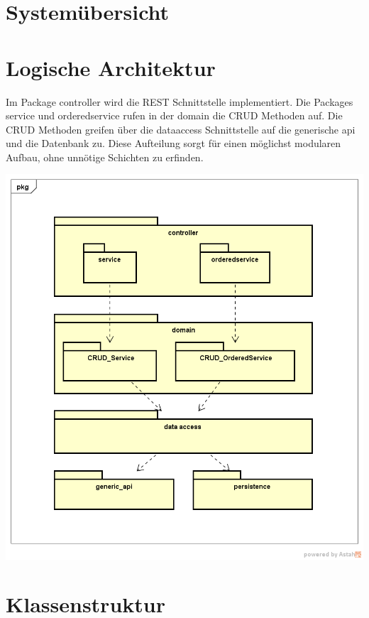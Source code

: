 \documentclass[11pt]{scrartcl}
\begin{document}
\newpage

\section{Systemübersicht}

\section{Logische Architektur}
Im Package controller wird die REST Schnittstelle implementiert. Die Packages service und orderedservice rufen in der domain die CRUD Methoden auf. Die CRUD Methoden greifen über die dataaccess Schnittstelle auf die generische api und die Datenbank zu. Diese Aufteilung sorgt für einen möglichst modularen Aufbau, ohne unnötige Schichten zu erfinden.

\begin{center}
\includegraphics[scale=0.5]{LogischeSicht}
\end{center}

\newpage

\section{Klassenstruktur}
\end{document}
